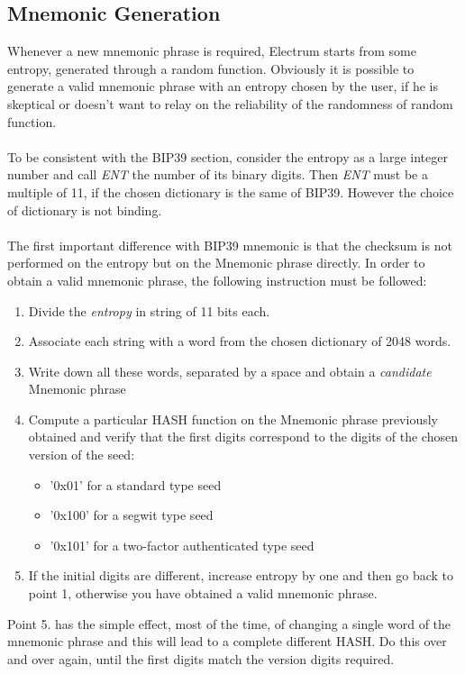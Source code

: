 \subsection{Mnemonic Generation}
Whenever a new mnemonic phrase is required, Electrum starts from some entropy, generated through a random function. Obviously it is possible to generate a valid mnemonic phrase with an entropy chosen by the user, if he is skeptical or doesn't want to relay on the reliability of the randomness of random function.
\\ \\
To be consistent with the BIP39 section, consider the entropy as a large integer number and call \textit{ENT} the number of its binary digits. Then \textit{ENT} must be a multiple of 11, if the chosen dictionary is the same of BIP39. However the choice of dictionary is not binding.
\\ \\
The first important difference with BIP39 mnemonic is that the checksum is not performed on the entropy but on the Mnemonic phrase directly. In order to obtain a valid mnemonic phrase, the following instruction must be followed:
\begin{enumerate}
	\item Divide the \textit{entropy} in string of 11 bits each.
	\item Associate each string with a word from the chosen dictionary of 2048 words.
	\item Write down all these words, separated by a space and obtain a \textit{candidate} Mnemonic phrase
	\item Compute a particular HASH function on the Mnemonic phrase previously obtained and verify that the first digits correspond to the digits of the chosen version of the seed:
	\begin{itemize}
		\item '0x01' for a standard type seed
		\item '0x100' for a segwit type seed
		\item '0x101' for a two-factor authenticated type seed
	\end{itemize}
	\item If the initial digits are different, increase entropy by one and then go back to point 1, otherwise you have obtained a valid mnemonic phrase.
\end{enumerate}
Point 5. has the simple effect, most of the time, of changing a single word of the mnemonic phrase and this will lead to a complete different HASH. Do this over and over again, until the first digits match the version digits required.
